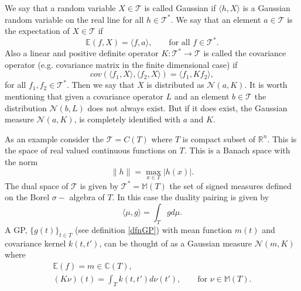 \documentclass[12pt]{book}
\newcommand{\E}{\mathbb{E}} %
\newcommand{\tvs}{\mathscr{T}} %
\begin{document}
We say that a random variable $X\in\tvs$ is called Gaussian if $\langle h,X\rangle$ is
a Gaussian random variable on the real line for all $h\in\tvs^{*}$. We say that an element $a\in\tvs$ is the 
expectation of $X\in\tvs$ if 
\begin{equation*}
\E(f,X)=\langle f, a\rangle,\qquad\text{for all }f\in\tvs^{*}.
\end{equation*}
Also a linear and positive definite operator $K:\tvs^{*}\longrightarrow \tvs$ 
is called the covariance operator (e.g. covariance
matrix in the finite dimensional case) if
\begin{equation*}
cov(\langle f_{1},X\rangle,\langle f_{2},X\rangle)=\langle f_{1},Kf_{2}\rangle,
\end{equation*}
for all $f_{1},f_{2}\in\tvs^{*}$. Then we say that $X$ is distributed as 
$\mathcal{N}(a,K)$. It is worth mentioning
that given a covariance operator $L$ and an element $b\in\tvs$ the distribution $\mathcal{N}(b,L)$
does not always exist. But if it does exist, the  Gaussian measure $\mathcal{N}(a,K)$, is completely
identified with $a$ and $K$.
\newline



As an example consider the  $\tvs=C(T)$ where 
$T$ is compact subset of $\mathbb{R}^{n}$. This is the  space of real valued continuous functions 
on
$T$. This  is a Banach
space with the norm \cite{bressan1900lecture}
\begin{equation*}
\|h\|=\max_{x\in T}|h(x)|.
\end{equation*}
The dual space of $\tvs$ is given by $\tvs^{*}=\mathbb{M}(T)$ the set of signed measures defined on 
the Borel $\sigma-$ algebra of  $T$. In this 
case the duality pairing is given by 
\begin{equation*}
\langle\mu,g \rangle=\int_{T}gd\mu.
\end{equation*}
A GP,  $\{g(t)\}_{t\in T}$ (see definition \ref{dfnGP}) with mean function $m(t)$ and 
covariance kernel $k(t,t')$, can be thought of as a Gaussian measure $\mathcal{N}(m,K)$
where
\cite{lifshits2012lectures} 
\begin{eqnarray*}
\E(f)=m\in\mathbb{C}(T), \\
(K\nu)(t)=\int_{T}k(t,t')d\nu(t'),\qquad\text{for }\nu\in\mathbb{M}(T).
\end{eqnarray*}
\end{document}
